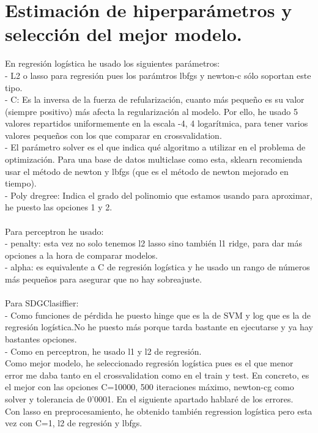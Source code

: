 \documentclass[12pt]{article}
\begin{document}
\section{Estimación de hiperparámetros y selección del mejor modelo.}

En regresión logística he usado los siguientes parámetros:\\
- L2 o lasso para regresión pues los parámtros lbfgs y newton-c sólo soportan este tipo.\\
- C: Es la inversa de la fuerza de refularización, cuanto más pequeño es su valor (siempre positivo) más afecta la regularización al modelo. Por ello, he usado 5 valores repartidos uniformemente en la escala -4, 4 logarítmica, para tener varios valores pequeños con los que comparar en crossvalidation.\\
- El parámetro solver es el que indica qué algoritmo a utilizar en el problema de optimización. Para una base de datos multiclase como esta, sklearn recomienda usar el método de newton y lbfgs (que es el método de newton mejorado en tiempo).\\
- Poly dregree: Indica el grado del polinomio que estamos usando para aproximar, he puesto las opciones 1 y 2.\\\\
Para perceptron he usado:\\
- penalty: esta vez no solo tenemos l2 lasso sino también l1 ridge, para dar más opciones a la hora de comparar modelos.\\
- alpha: es equivalente a C de regresión logística y he usado un rango de números más pequeños para asegurar que no hay sobreajuste.\\\\
Para SDGClasiffier:\\
- Como funciones de pérdida he puesto hinge que es la de SVM y log que es la de regresión logística.No he puesto más porque tarda bastante en ejecutarse y ya hay bastantes opciones.\\
- Como en perceptron, he usado l1 y l2 de regresión.\\
Como mejor modelo, he seleccionado regresión logística pues es el que menor error me daba tanto en el crossvalidation como en el train y test. En concreto, es el mejor con las opciones C=10000, 500 iteraciones máximo, newton-cg como solver y tolerancia de 0'0001. En el siguiente apartado hablaré de los errores.\\
Con lasso en preprocesamiento, he obtenido también regression logística pero esta vez con C=1, l2 de regresión y lbfgs.
\end{document}
